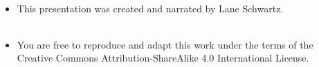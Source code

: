 \begin{frame}
\ \\

\begin{itemize}
\item[\textbullet] This presentation was created and narrated by Lane Schwartz. \\ \ \\
\item[\textbullet] You are free to reproduce and adapt this work under the terms of the Creative Commons Attribution-ShareAlike 4.0 International License.
\end{itemize}

\end{frame}